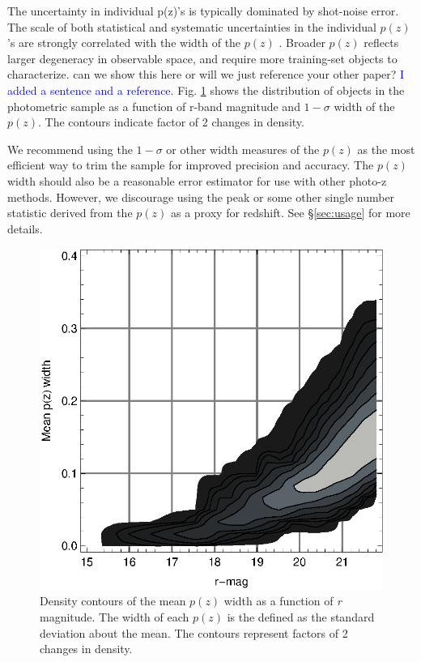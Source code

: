 \documentclass{emulateapj}
\begin{document}
The uncertainty in individual p(z)'s is typically dominated by shot-noise
error.  The scale of both statistical and systematic uncertainties in the
individual $p(z)$'s are strongly correlated with the width of the $p(z)$ \cite{CunhaPhotoz09}.
Broader $p(z)$ reflects larger degeneracy in observable space, and require more training-set
objects to characterize. 
{\color{red} can we show this here or will we just reference your other
paper?} 
\textcolor{blue}{I added a sentence and a reference}.  
Fig.  \ref{fig:pzwidth} shows the distribution of objects in the
photometric sample as a function of r-band magnitude and $1-\sigma$ width of
the $p(z)$.  The contours indicate factor of 2 changes in density.  

We recommend using the $1-\sigma$ or other width measures of the $p(z)$ as the
most efficient way to trim the sample for improved precision and accuracy.  The
$p(z)$ width should also be a reasonable error estimator for use with other
photo-z methods.  However, we discourage using the peak or some other single
number statistic derived from the $p(z)$ as a proxy for redshift. See 
\S \ref{sec:usage} for more details.

\begin{figure}[p]\centering
    \includegraphics[scale=1.25]{figures/pzwidth25bins.eps}
    \caption{Density contours of the mean $p(z)$ width as a function of {\it r} magnitude. 
The width of each $p(z)$ is the defined as the standard deviation about the mean. 
The contours represent factors of 2 changes in density.}
    \label{fig:pzwidth}
    \vspace{2em}
\end{figure}
\end{document}
